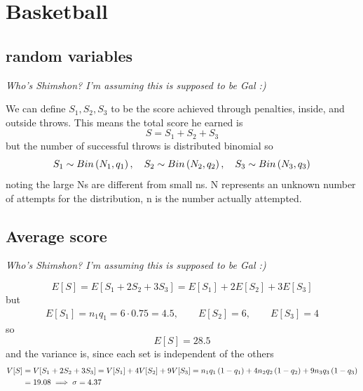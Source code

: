 \clearpage
\section{Basketball}
\subsection{random variables}
\emph{Who's Shimshon? I'm assuming this is supposed to be Gal :)}

We can define \(S_1,S_2,S_3\) to be the score achieved through penalties, inside, and outside throws. This means the total score he earned is
\begin{equation}
    S = S_1+S_2+S_3
\end{equation}
but the number of successful throws is distributed binomial so 
\begin{equation}
    S_1\sim Bin\left(N_1,q_1\right),\quad S_2\sim Bin\left(N_2,q_2\right),\quad S_3\sim Bin\left(N_3,q_3\right)
\end{equation}
noting the large Ns are different from small ns. N represents an unknown number of attempts for the distribution, n is the number actually attempted.
\subsection{Average score}
\emph{Who's Shimshon? I'm assuming this is supposed to be Gal :)}

\begin{equation}
    E[S]=E[S_1+2S_2+3S_3]=E[S_1]+2E[S_2]+3E[S_3]
\end{equation}
but 
\begin{align}
    E[S_1]=n_1q_1=6\cdot0.75=4.5,\qquad E[S_2]=6,\qquad E[S_3]=4
\end{align}
so 
\begin{equation}
    E[S]=28.5
\end{equation}
and the variance is, since each set is independent of the others
\begin{align}
    V[S]&=V[S_1+2S_2+3S_3]=V[S_1]+4V[S_2]+9V[S_3]=n_1q_1\left(1-q_1\right)+4n_2q_2\left(1-q_2\right)+9n_3q_3\left(1-q_3\right)\\
    &= 19.08 \implies \sigma= 4.37
\end{align}

